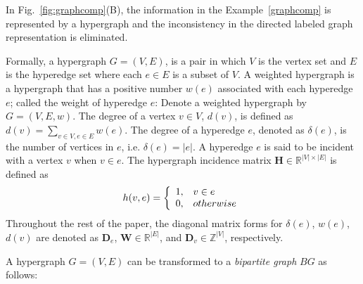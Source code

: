 In Fig.~\ref{fig:graphcomp}(B), the information in the Example~\ref{graphcomp} is represented by a hypergraph and the inconsistency in the directed labeled graph representation is eliminated.

\begin{mydef}
Formally, a hypergraph $G = (V,E)$, is a pair in which $V$ is the vertex set and $E$ is the hyperedge set where each $e \in E$ is a subset of $V$. A weighted hypergraph is a hypergraph that has a positive number $w(e)$ associated with each hyperedge $e$; called the weight of hyperedge $e$: Denote a weighted hypergraph by $G = (V,E,w)$. The degree of a vertex $v \in V$, $d(v)$, is defined as $d(v) = \sum_{v\in V, e\in E}{w(e)}$. The degree of a hyperedge $e$, denoted as $\delta(e)$, is the number of vertices in $e$, i.e. $\delta(e)=|e|$. A hyperedge $e$ is said to be incident with a vertex $v$ when $v \in e$. The hypergraph incidence matrix $\mathbf{H} \in \mathbb{R}^{|V| \times |E|}$ is defined as
\begin{equation}
\notag h(v,e)=\left\{\begin{array}{cl}
	   1, & v \in e \\
	   0, & otherwise
	   \end{array}\right.
\end{equation}
Throughout the rest of the paper, the diagonal matrix forms for $\delta(e)$, $w(e)$, $d(v)$ are denoted as $\mathbf{D}_e$, $\mathbf{W} \in \mathbb{R}^{|E|}$, and $\mathbf{D}_v \in \mathbb{Z}^{|V|}$, respectively.
\end{mydef}

A hypergraph $G = (V, E)$ can be transformed to a \emph{bipartite graph} $BG$ as follows:

